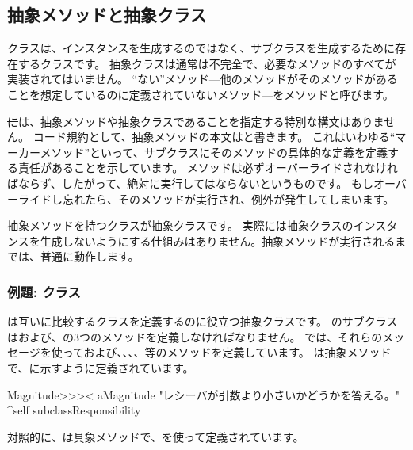 \documentclass[a4paper,10pt,twoside]{book}
\begin{document}
\subsection{抽象メソッドと抽象クラス}

クラスは、インスタンスを生成するのではなく、サブクラスを生成するために存在するクラスです。
抽象クラスは通常は不完全で、必要なメソッドのすべてが実装されてはいません。
``ない''メソッド---他のメソッドがそのメソッドがあることを想定しているのに定義されていないメソッド---をメソッドと呼びます。

\st には、抽象メソッドや抽象クラスであることを指定する特別な構文はありません。
コード規約として、抽象メソッドの本文は\mbox{}と書きます。
これはいわゆる``マーカーメソッド''といって、サブクラスにそのメソッドの具体的な定義を定義する責任があることを示しています。
メソッドは必ずオーバーライドされなければならず、したがって、絶対に実行してはならないというものです。
もしオーバーライドし忘れたら、そのメソッドが実行され、例外が発生してしまいます。

抽象メソッドを持つクラスが抽象クラスです。
実際には抽象クラスのインスタンスを生成しないようにする仕組みはありません。抽象メソッドが実行されるまでは、普通に動作します。

\subsubsection{例題: クラス}
は互いに比較するクラスを定義するのに役立つ抽象クラスです。
のサブクラスは\ct{<}および\ct{=}、の3つのメソッドを定義しなければなりません。
では、それらのメッセージを使って\ct{>}および\ct{>=}、\ct{<=}、、、等のメソッドを定義しています。
は抽象メソッドで、に示すように定義されています。

\begin{method}[MagnitudeLessThan]{}
Magnitude>>>< aMagnitude 
	"レシーバが引数より小さいかどうかを答える。"
	^self subclassResponsibility
\end{method}

\noindent
対照的に、は具象メソッドで、\ct{<}を使って定義されています。
\end{document}
